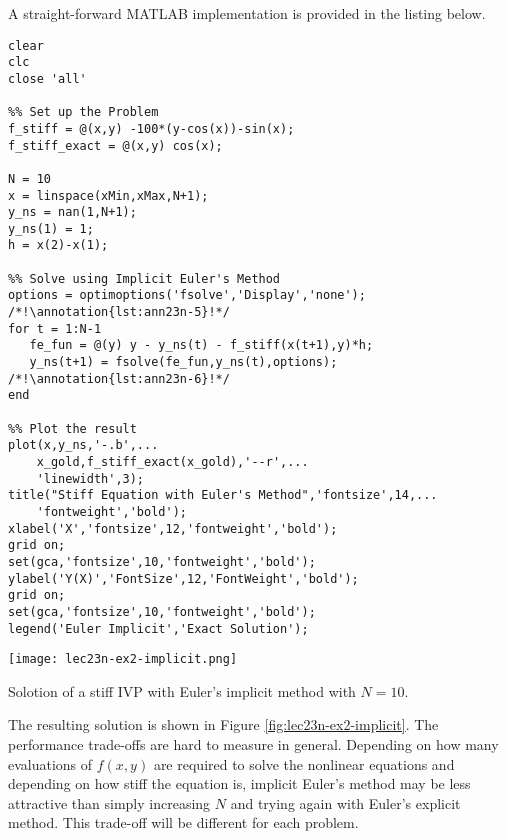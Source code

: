 A straight-forward MATLAB implementation is provided in the listing below.
\begin{lstlisting}[style=myMatlab,name=lec23n-ex2]
clear
clc
close 'all'

%% Set up the Problem
f_stiff = @(x,y) -100*(y-cos(x))-sin(x);
f_stiff_exact = @(x,y) cos(x);

N = 10
x = linspace(xMin,xMax,N+1);
y_ns = nan(1,N+1);
y_ns(1) = 1;
h = x(2)-x(1);

%% Solve using Implicit Euler's Method
options = optimoptions('fsolve','Display','none'); /*!\annotation{lst:ann23n-5}!*/
for t = 1:N-1
   fe_fun = @(y) y - y_ns(t) - f_stiff(x(t+1),y)*h;
   y_ns(t+1) = fsolve(fe_fun,y_ns(t),options); /*!\annotation{lst:ann23n-6}!*/
end

%% Plot the result
plot(x,y_ns,'-.b',...
    x_gold,f_stiff_exact(x_gold),'--r',...
    'linewidth',3);
title("Stiff Equation with Euler's Method",'fontsize',14,...
    'fontweight','bold');
xlabel('X','fontsize',12,'fontweight','bold');
grid on;
set(gca,'fontsize',10,'fontweight','bold');
ylabel('Y(X)','FontSize',12,'FontWeight','bold');
grid on;
set(gca,'fontsize',10,'fontweight','bold');
legend('Euler Implicit','Exact Solution');
\end{lstlisting}
\begin{marginfigure}
\texttt{[image: lec23n-ex2-implicit.png]}
\caption{Solotion of a stiff IVP with Euler's implicit method with $N=10$.}
\label{fig:lec23n-ex2-implicit}
\end{marginfigure}
The resulting solution is shown in Figure \ref{fig:lec23n-ex2-implicit}.  The performance trade-offs are hard to measure in general. Depending on how many evaluations of $f(x,y)$ are required to solve the nonlinear equations and depending on how stiff the equation is, implicit Euler's method may be less attractive than simply increasing $N$ and trying again with Euler's explicit method.  This trade-off will be different for each problem.












